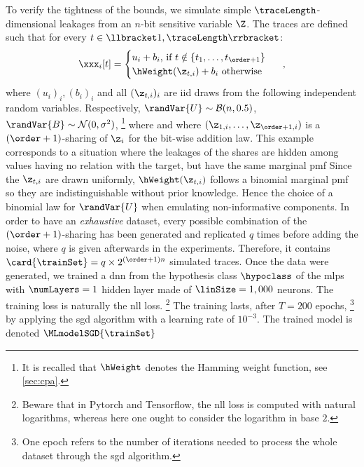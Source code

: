 To verify the tightness of the bounds, we simulate simple \(\traceLength\)-dimensional leakages from an \(n\)-bit sensitive variable \(\Z\).
The traces are defined such that for every \(t \in \llbracket1, \traceLength\rrbracket\):
\begin{equation}
	\xxx_i[t] =
	\begin{cases}
		u_i + b_i \mbox{, if } t \notin \{t_1, \ldots, t_{\order+1}\} \\
		\hWeight(\z_{t,i}) + b_i \mbox{ otherwise}
	\end{cases}
	\enspace ,
\end{equation}
where \((u_i)_i, (b_i)_i\) and all \((\z_{t,i})_i\) are \gls{iid} draws from the following independent random variables.
Respectively, \(\randVar{U} \sim \mathcal{B}(n, 0.5)\),
\(\randVar{B} \sim \mathcal{N}(0, \sigma^2)\),%
\footnote{
	It is recalled that \(\hWeight\) denotes the Hamming weight function, see \autoref{sec:cpa}.
} 
where  and where \((\z_{1,i}, \ldots, \z_{\order+1,i})\) is a \((\order+1)\)-sharing of \(\z_i\) for the bit-wise addition law.
This example corresponds to a situation where the leakages of the shares are hidden among values having no relation with the target, but have the same marginal \gls{pmf}
Since the \(\z_{t, i}\) are drawn uniformly, \(\hWeight(\z_{t, i})\) follows a binomial marginal \gls{pmf} so they are indistinguishable without prior knowledge. 
Hence the choice of a binomial law for \(\randVar{U}\) when emulating non-informative components.
In order to have an \emph{exhaustive} dataset, every possible combination of the \((\order + 1)\)-sharing has been generated and replicated \(q\) times before adding the noise, where \(q\) is given afterwards in the experiments.
Therefore, it contains \(\card{\trainSet} = q \times 2^{(\order+1)n}\) simulated traces.
Once the data were generated, we trained a \gls{dnn} from the hypothesis class \(\hypoclass\) of the \glspl{mlp} with \(\numLayers=1\) hidden layer made of \(\linSize = 1,000\) neurons.
The training loss is naturally the \gls{nll} loss.%
\footnote{
	Beware that in Pytorch and \textsf{Tensorflow}, the \gls{nll} loss is computed with natural logarithms, whereas here one ought to consider the logarithm in base \(2\).
}
The training lasts, after \(T = 200\) epochs,%
\footnote{
	One epoch refers to the number of iterations needed to process the whole dataset through the \gls{sgd} algorithm.
}
by applying the \gls{sgd} algorithm with a learning rate of \(10^{-3}\).
The trained model is denoted \(\MLmodelSGD{\trainSet}\)

